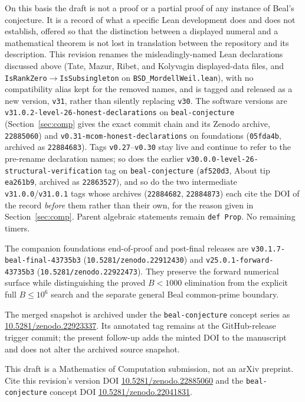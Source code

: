 On this basis the draft is not a proof or a partial proof of any
instance of Beal's conjecture. It is a record of what a specific
Lean development does and does not establish, offered so that the
distinction between a displayed numeral and a mathematical theorem
is not lost in translation between the repository and its
description. This revision renames the misleadingly-named Lean
declarations discussed above (Tate, Mazur, Ribet, and Kolyvagin
displayed-data files, and
\texttt{IsRankZero}$\to$\texttt{IsSubsingleton} on
\texttt{BSD\_MordellWeil.lean}), with no compatibility alias kept
for the removed names, and is tagged and released as a new version,
\texttt{v31}, rather than silently replacing \texttt{v30}. The
software versions are \texttt{v31.0.2-level-26-honest-declarations}
on \texttt{beal-conjecture} (Section~\ref{sec:comp} gives the exact
commit chain and its Zenodo archive, \texttt{22885060}) and
\texttt{v0.31-mcom-honest-declarations} on foundations
(\texttt{05fda4b}, archived as \texttt{22884683}). Tags
\texttt{v0.27}--\texttt{v0.30} stay live and continue to refer to
the pre-rename declaration names; so does the earlier
\texttt{v30.0.0-level-26-structural-verification} tag on
\texttt{beal-conjecture} (\texttt{af520d3}, About tip
\texttt{ea261b9}, archived as \texttt{22863527}), and so do the two
intermediate \texttt{v31.0.0}/\texttt{v31.0.1} tags whose archives
(\texttt{22884682}, \texttt{22884873}) each cite the DOI of the
record \emph{before} them rather than their own, for the reason
given in Section~\ref{sec:comp}. Parent algebraic statements remain
\texttt{def Prop}. No remaining timers.

The companion foundations end-of-proof and post-final releases are
\texttt{v30.1.7-beal-final-43735b3}
(\texttt{10.5281/zenodo.22912430}) and
\texttt{v25.0.1-forward-43735b3}
(\texttt{10.5281/zenodo.22922473}). They preserve the forward numerical
surface while distinguishing the proved $B<1000$ elimination from the
explicit full $B\leq10^6$ search and the separate general Beal
common-prime boundary.

The merged snapshot is archived under the \texttt{beal-conjecture} concept
series as
\href{https://doi.org/10.5281/zenodo.22923337}{10.5281/zenodo.22923337}.
Its annotated tag remains at the GitHub-release trigger commit; the present
follow-up adds the minted DOI to the manuscript and does not alter the
archived source snapshot.

This draft is a Mathematics of Computation submission, not an arXiv
preprint. Cite this revision's version DOI
\href{https://doi.org/10.5281/zenodo.22885060}{10.5281/zenodo.22885060}
and the \texttt{beal-conjecture} concept DOI
\href{https://doi.org/10.5281/zenodo.22041831}{10.5281/zenodo.22041831}.
